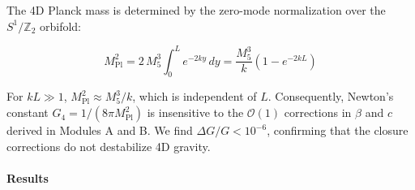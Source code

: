 \documentclass[
  11pt,
]{article}
\begin{document}
The 4D Planck mass is determined by the zero-mode normalization over the
\(S^1/\mathbb{Z}_2\) orbifold:

\[M_\text{Pl}^2 = 2\,M_5^3\int_0^L e^{-2ky}\,dy = \frac{M_5^3}{k}\left(1 - e^{-2kL}\right) \tag{144}\]

For \(kL \gg 1\), \(M_\text{Pl}^2 \approx M_5^3/k\), which is
independent of \(L\). Consequently, Newton's constant
\(G_4 = 1/(8\pi M_\text{Pl}^2)\) is insensitive to the
\(\mathcal{O}(1)\) corrections in \(\beta\) and \(c\) derived in Modules
A and B. We find \(\Delta G/G < 10^{-6}\), confirming that the closure
corrections do not destabilize 4D gravity.

\bigskip

\hypertarget{results-8}{%
\paragraph{Results}\label{results-8}}
\end{document}

